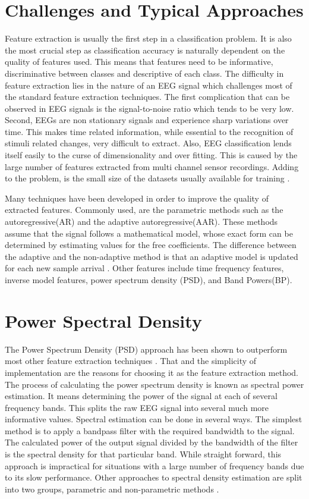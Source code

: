 \documentclass[12pt, a4paper, fleqn]{memoir}%
\begin{document}
\section{Challenges and Typical Approaches}
\label{sec:CommonMethods}
Feature extraction is usually the first step in a classification problem. It is also the most crucial step as classification accuracy is naturally dependent on the quality of features used. This means that features need to be informative, discriminative between classes and descriptive of each class. The difficulty in feature extraction lies in the nature of an EEG signal which challenges most of the standard feature extraction techniques. The first complication that can be observed in EEG signals is the signal-to-noise ratio which tends to be very low. Second, EEGs are non stationary signals and experience sharp variations over time. This makes time related information, while essential to the recognition of stimuli related changes, very difficult to extract. Also, EEG classification lends itself easily to the curse of dimensionality and over fitting. This is caused by the large number of features extracted from multi channel sensor recordings. Adding to the problem, is the small size of the datasets usually available for training \cite{lotte2007review}.

Many techniques have been developed in order to improve the quality of extracted features. Commonly used, are the parametric methods such as the autoregressive(AR) and the adaptive autoregressive(AAR). These methods assume that the signal follows a mathematical model, whose exact form can be determined by estimating values for the free coefficients. The difference between the adaptive and the non-adaptive method is that an adaptive model is updated for each new sample arrival \cite{pardey1996review}. Other features include time frequency features, inverse model features, power spectrum density (PSD), and Band Powers(BP).

\section{Power Spectral Density}
\label{sec:psd}
The Power Spectrum Density (PSD) approach has been shown to outperform most other feature extraction techniques \cite{du2004temporal}. That and the simplicity of implementation are the reasons for choosing it as the feature extraction method. The process of calculating the power spectrum density is known as spectral power estimation. It means determining the power of the signal at each of several frequency bands. This splits the raw EEG signal into several much more informative values. Spectral estimation can be done in several ways. The simplest method is to apply a bandpass filter with the required bandwidth to the signal. The calculated power of the output signal divided by the bandwidth of the filter is the spectral density for that particular band. While straight forward, this approach is impractical for situations with a large number of frequency bands due to its slow performance. Other approaches to spectral density estimation are split into two groups, parametric and non-parametric methods \cite{stoica2005spectral}.
\end{document}
